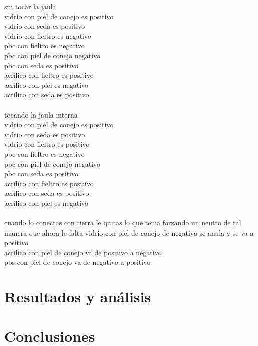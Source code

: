 \documentclass{article}
\begin{document}
\begin{multicols}{2}
	sin tocar la jaula \\
	vidrio con piel de conejo es positivo \\
	vidrio con seda es positivo \\
	vidrio con fieltro es negativo \\
	pbc con fieltro es negativo \\
	pbc con piel de conejo negativo \\
	pbc con seda es positivo \\
	acrílico con fieltro es positivo \\
	acrílico con piel es negativo \\
	acrílico con seda es positivo \\
	\\
	tocando la jaula interna \\
	vidrio con piel de conejo es positivo \\
	vidrio con seda es positivo \\
	vidrio con fieltro es positivo \\
	pbc con fieltro es negativo \\
	pbc con piel de conejo negativo \\
	pbc con seda es positivo \\
	acrílico con fieltro es positivo \\
	acrílico con seda es positivo \\
	acrílico con piel es negativo \\
	\\
	cuando lo conectas con tierra le quitas lo que tenia forzando un neutro de tal manera que ahora le falta
	vidrio con piel de conejo de negativo se anula y se va a positivo\\
	acrílico con piel de conejo va de positivo a negativo \\
	pbs con piel de conejo va de negativo a positivo \\

\end{multicols}
\section{Resultados y análisis}\label{Resultados}			%

\section{Conclusiones}\label{Conclusiones}				%
\end{document}

